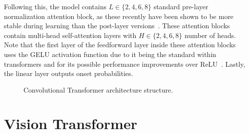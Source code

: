 Following this, the model contains $L \in \{2, 4, 6, 8\}$ standard pre-layer normalization attention block, as these recently have been shown to be more stable during learning than the post-layer versions~\cite{pmlr-v119-xiong20b}. These attention blocks contain multi-head self-attention layers with $H \in \{2, 4, 6, 8\}$ number of heads. Note that the first layer of the feedforward layer inside these attention blocks uses the \gls{GELU} activation function due to it being the standard within transformers and for its possible performance improvements over \gls{ReLU}~\cite{devlin-etal-2019-bert, hendrycks2023gaussianerrorlinearunits}. Lastly, the linear layer outputs onset probabilities.

\begin{figure}[H]
    \centering
    
    \caption{Convolutional Transformer architecture structure.}
    \label{CTFigure}
\end{figure}

\section{Vision Transformer}